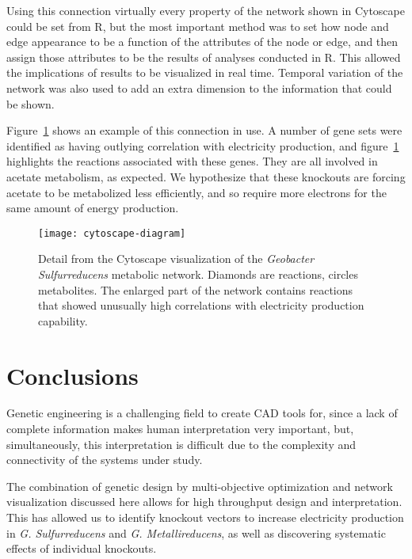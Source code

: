 \documentclass[a4paper,twocolumn]{article}
\begin{document}
Using this connection virtually every property of the network shown in Cytoscape could be set from R, but the most important method was to set how node and edge appearance to be a function of the attributes of the node or edge, and then assign those attributes to be the results of analyses conducted in R. This allowed the implications of results to be visualized in real time. Temporal variation of the network was also used to add an extra dimension to the information that could be shown.

Figure~\ref{fig:cytoscape-screenshot} shows an example of this connection in use. A number of gene sets were identified as having outlying correlation with electricity production, and figure~\ref{fig:cytoscape-screenshot} highlights the reactions associated with these genes. They are all involved in acetate metabolism, as expected. We hypothesize that these knockouts are forcing acetate to be metabolized less efficiently, and so require more electrons for the same amount of energy production.

\begin{figure}[!htb]
\texttt{[image: cytoscape-diagram]}
\caption{Detail from the Cytoscape visualization of the {\it Geobacter Sulfurreducens} metabolic network. Diamonds are reactions, circles metabolites. The enlarged part of the network contains reactions that showed unusually high correlations with electricity production capability.}
\label{fig:cytoscape-screenshot}
\end{figure}

\section{Conclusions}

Genetic engineering is a challenging field to create CAD tools for, since a lack of complete information makes human interpretation very important, but, simultaneously, this interpretation is difficult due to the complexity and connectivity of the systems under study. 


The combination of genetic design by multi-objective optimization and network visualization discussed here allows for high throughput design and interpretation. This has allowed us to identify knockout vectors to increase electricity production in {\it G. Sulfurreducens} and {\it G. Metallireducens}, as well as discovering systematic effects of individual knockouts.
\end{document}
